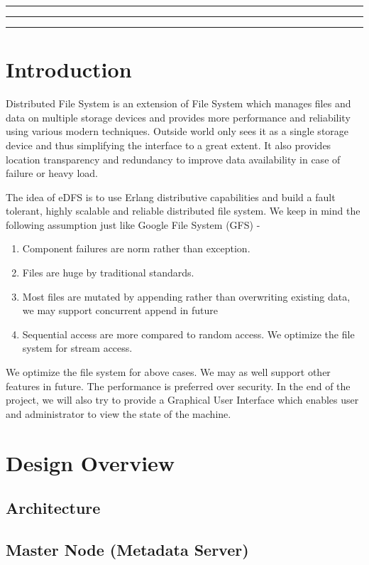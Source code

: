 \documentclass[a4paper,12pt]{article}
\begin{document}

\tableofcontents
\vspace{0.5cm}
\hrule \hrule \hrule
\newpage

\section{Introduction}
Distributed File System is an extension of File System which manages files and data on multiple storage devices and provides more performance and reliability using various modern techniques. Outside world only sees it as a single storage device and thus simplifying the interface to a great extent. It also provides location transparency and redundancy to improve data availability in case of failure or heavy load.

The idea of eDFS is to use Erlang distributive capabilities and build a fault tolerant, highly scalable and reliable distributed file system. We keep in mind the following assumption just like Google File System (GFS) \cite{ghemawat03} -
\begin{enumerate}
\item Component failures are norm rather than exception.
\item Files are huge by traditional standards.
\item Most files are mutated by appending rather than overwriting existing data, we may support concurrent append in future
\item Sequential access are more compared to random access. We optimize the file system for stream access.
\end{enumerate}

We optimize the file system for above cases. We may as well support other features in future. The performance is preferred over security. In the end of the project, we will also try to provide a Graphical User Interface which enables user and administrator to view the state of the machine.

\section{Design Overview}
\subsection{Architecture}
\subsection{Master Node (Metadata Server)}
\end{document}
